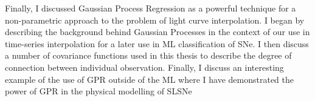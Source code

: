 Finally, I discussed Gaussian Process Regression as a powerful technique for a non-parametric approach to the problem of light curve interpolation. I began by describing the background behind Gaussian Processes in the context of our use in time-series interpolation for a later use in ML classification of SNe. I then discuss a number of covariance functions used in this thesis to describe the degree of connection between individual observation. Finally, I discuss an interesting example of the use of GPR outside of the ML where I have demonstrated the power of GPR in the physical modelling of SLSNe
